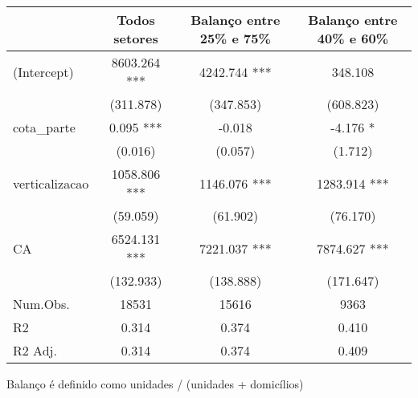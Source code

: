 \setlength{\LTpost}{0mm}
\begin{longtable}{lccc}
\toprule
  & Todos setores & Balanço entre 25\% e 75\% & Balanço entre 40\% e 60\% \\ 
\midrule\addlinespace[2.5pt]
(Intercept) & 8603.264 *** & 4242.744 *** & 348.108 \\ 
 & (311.878) & (347.853) & (608.823) \\ 
cota\_parte & 0.095 *** & -0.018 & -4.176 * \\ 
 & (0.016) & (0.057) & (1.712) \\ 
verticalizacao & 1058.806 *** & 1146.076 *** & 1283.914 *** \\ 
 & (59.059) & (61.902) & (76.170) \\ 
CA & 6524.131 *** & 7221.037 *** & 7874.627 *** \\ 
 & (132.933) & (138.888) & (171.647) \\ 
Num.Obs. & 18531 & 15616 & 9363 \\ 
R2 & 0.314 & 0.374 & 0.410 \\ 
R2 Adj. & 0.314 & 0.374 & 0.409 \\ 
\bottomrule
\end{longtable}
\begin{minipage}{\linewidth}
Balanço é definido como unidades / (unidades + domicílios)\\
\end{minipage}

